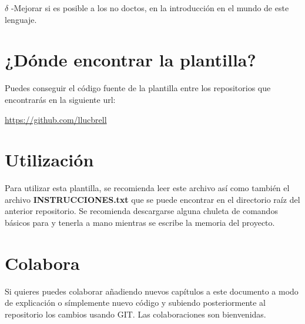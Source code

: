 \textbf{$\delta$} -Mejorar si es posible a los no doctos, en la introducción en el mundo de este lenguaje.

\section*{¿Dónde encontrar la plantilla?}
Puedes conseguir el código fuente de la plantilla entre los repositorios que encontrarás en la siguiente url:

\begin{center}\url{https://github.com/llucbrell}\end{center}

\section*{Utilización}
Para utilizar esta plantilla, se recomienda leer este archivo así como también el archivo \textbf{INSTRUCCIONES.txt} que se puede encontrar en el directorio raíz del anterior repositorio. Se recomienda descargarse alguna chuleta de comandos básicos para  y tenerla a mano mientras se escribe la memoria del proyecto. 

\section*{Colabora}
Si quieres puedes colaborar añadiendo nuevos capítulos a este documento a modo de explicación o símplemente nuevo código y subiendo posteriormente al repositorio los cambios usando  GIT. Las colaboraciones son bienvenidas. 
